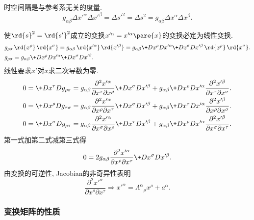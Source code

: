 \documentclass[hidelinks]{ctexart}
\begin{document}
\begin{resume}
    时空间隔是与参考系无关的度量.
    \[ g_{\alpha\beta}\Delta x'^\alpha \Delta x'^\beta = \Delta s'^2 = \Delta s^2 = g_{\alpha\beta}\Delta x^\alpha \Delta x^\beta. \]
\end{resume}
\begin{ex}
    使$\rd{s}^2 = \rd{s'}^2$成立的变换$x'^\alpha = x'^\alpha\pare{x}$的变换必定为线性变换.
    \begin{align*}
        & g_{\rho\sigma}\,\rd{x^\rho}\,\rd{x^\sigma} = g_{\alpha\beta}\,\rd{x'^\alpha}\,\rd{x'^\beta} = g_{\alpha\beta}\+D{x^\rho}D{x'^\alpha}\+D{x^\sigma}D{x'^\beta} \,\rd{x^\rho}\,\rd{x^\sigma}. \\
        & g_{\rho\sigma} = g_{\alpha\beta}\+D{x^\rho}D{x'^\alpha}\+D{x^\sigma}D{x'^\beta}.
    \end{align*}
    线性要求$x'$对$x$求二次导数为零.
    \begin{align*}
        & 0 = \+D{x^\tau}D{g_{\rho\sigma}} = g_{\alpha\beta}\frac{\partial^2 x'^\alpha}{\partial x^\tau \partial x^\rho} \+D{x^\sigma}D{x'^\beta} + g_{\alpha\beta} \+D{x^\rho}D{x'^\alpha} \frac{\partial^2 x'^\beta}{\partial x^\tau \partial x^\sigma}. \\
        & 0 = \+D{x^\rho}D{g_{\tau\sigma}} = g_{\alpha\beta} \frac{\partial^2 x'^\alpha}{\partial x^\rho \partial x^\tau}\+D{x^\sigma}D{x'^\beta} + g_{\alpha\beta}\+D{x^\tau}D{x'^\alpha}\frac{\partial^2 x'^\beta}{\partial x^\rho \partial x^\sigma}. \\
        & 0 = \+D{x^\sigma}D{g_{\rho\tau}} = g_{\alpha\beta} \frac{\partial^2 x'^\alpha}{\partial x^\sigma \partial x^\rho}\+D{x^\tau}D{x'^\beta} + g_{\alpha\beta}\+D{x^\rho}D{x'^\alpha}\frac{\partial^2 x'^\beta}{\partial x^\sigma \partial x^\tau}. \\
    \end{align*}
    第一式加第二式减第三式得
    \[ 0 = 2g_{\alpha\beta}\frac{\partial^2 x'^\alpha}{\partial x^\rho \partial x^\tau} \+D{x^\sigma}D{x'^\beta}. \]
    由变换的可逆性, Jacobian的非奇异性表明
    \[ \frac{\partial^2 x'^\alpha}{\partial x^\rho \partial x^\tau} \Rightarrow x'^\alpha = {\Lambda^\alpha}_\rho x^\rho + a^\alpha. \]
\end{ex}


\subsubsection{变换矩阵的性质} %
\label{ssub:变换矩阵的性质}
\end{document}
